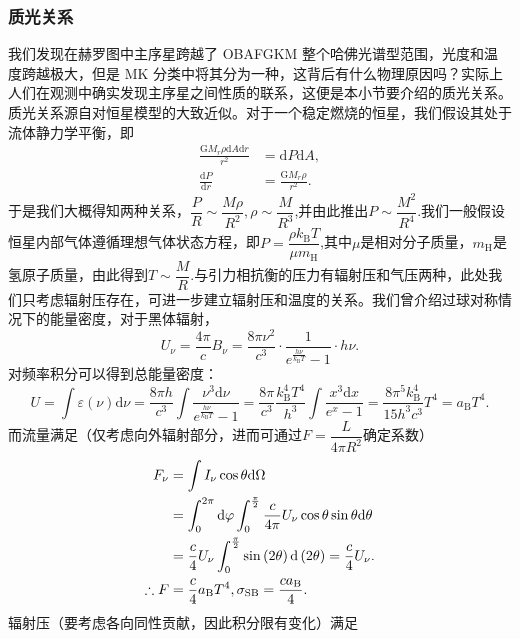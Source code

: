 \documentclass[../天体物理基础.tex]{subfiles}
\begin{document}
\subsubsection{质光关系}
我们发现在赫罗图中主序星跨越了 OBAFGKM 整个哈佛光谱型范围，光度和温度跨越极大，但是 MK 分类中将其分为一种，这背后有什么物理原因吗？实际上人们在观测中确实发现主序星之间性质的联系，这便是本小节要介绍的质光关系。质光关系源自对恒星模型的大致近似。对于一个稳定燃烧的恒星，我们假设其处于流体静力学平衡，即
\begin{align}
\frac{\mathrm{G}M_{r}\rho\mathrm{d}A\mathrm{d}r}{r^{2}}&=\mathrm{d}P\mathrm{d}A,\\
\frac{\mathrm{d}P}{\mathrm{d}r}&=\frac{\mathrm{G}M_{r}\rho}{r^{2}}.\label{1.4.4}
\end{align}
于是我们大概得知两种关系，$\dfrac{P}{R}\sim\dfrac{M\rho}{R^{2}},\rho\sim\dfrac{M}{R^{3}}$,并由此推出$P\sim\dfrac{M^{2}}{R^{4}}$.我们一般假设恒星内部气体遵循理想气体状态方程，即$P=\dfrac{\rho k_{\text{B}}T}{\mu m_{\mathrm{H}}}$,其中$\mu$是相对分子质量，$m_{\mathrm{H}}$是氢原子质量，由此得到$T\sim\dfrac{M}{R}$.与引力相抗衡的压力有辐射压和气压两种，此处我们只考虑辐射压存在，可进一步建立辐射压和温度的关系。我们曾介绍过球对称情况下的能量密度，对于黑体辐射，
\begin{equation}
U_{\nu}=\frac{4\pi{}}{c}B_{\nu}=\frac{8\pi\nu^{2}}{c^{3}}\cdot\frac{1}{e^{\frac{h\nu}{k_{\text{B}}T}}-1}\cdot h\nu.
\end{equation}
对频率积分可以得到总能量密度：
\begin{equation}
U=\int\varepsilon\left(\nu\right)\mathrm{d}\nu=\frac{8\pi h}{c^3}\int\frac{\nu^3\mathrm{d}\nu}{e^{\frac{h\nu}{k_{\text{B}}T}}-1}=\frac{8\pi}{c^3}\frac{k_{\text{B}}^4T^4}{h^3}\int\frac{x^3\mathrm{d}x}{e^{x}-1}=\frac{8\pi^{5}k_{\text{B}}^{4}}{15h^{3}c^{3}}T^{4}=a_{\text{B}}T^4.
\end{equation}
而流量满足（仅考虑向外辐射部分，进而可通过$F=\dfrac{L}{4\pi R^{2}}$确定系数）
\begin{align}
F_\nu&=\int I_\nu\cos\theta\mathrm{d}\Omega\notag\\
&=\int_0^{2\pi}\mathrm{d}\varphi\int_0^{\frac{\pi}{2}}\frac{c}{4\pi}U_\nu\cos\theta\sin\theta\mathrm{d}\theta\notag\\
&=\frac{c}{4}U_\nu\int_0^{\frac{\pi}{2}}\sin\left(2\theta\right)\mathrm{d}\left(2\theta\right)=\frac{c}{4}U_\nu.\\
\therefore F&=\frac{c}{4}a_{\text{B}}T^4,\sigma_{\text{SB}}=\frac{ca_{\text{B}}}{4}.
\end{align}
辐射压（要考虑各向同性贡献，因此积分限有变化）满足
\end{document}
